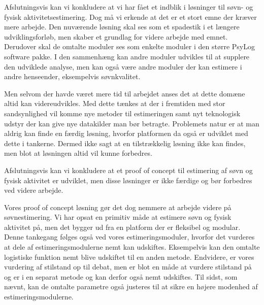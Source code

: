 Afslutningsvis kan vi konkludere at vi har fået et indblik i løsninger til søvn- og fysisk aktivitetsestimering.
Dog må vi erkende at det er et stort emne der kræver mere arbejde.
Den nuværende løsning skal ses som et spadestik i et længere udviklingsforløb, men skaber et grundlag for videre arbejde med emnet.
Derudover skal de omtalte moduler ses som enkelte moduler i den større PsyLog software pakke.
I den sammenhæng kan andre moduler udvikles til at supplere den udviklede analyse, men kan også være andre moduler der kan estimere i andre henseender, eksempelvis søvnkvalitet.


Men selvom der havde været mere tid til arbejdet anses det at dette domæne altid kan videreudvikles.
Med dette tænkes at der i fremtiden med stor sandsynlighed vil komme nye metoder til estimeringen samt nyt teknologisk udstyr der kan give nye datakilder man bør betragte.
Problemets natur er at man aldrig kan finde en færdig løsning, hvorfor platformen da også er udviklet med dette i tankerne.
Dermed ikke sagt at en tilstrækkelig løsning ikke kan findes, men blot at løsningen altid vil kunne forbedres.

Afslutningsvis kan vi konkludere at et proof of concept til estimering af søvn og fysisk aktivitet er udviklet, men disse løsninger er ikke færdige og bør forbedres ved videre arbejde.

Vores proof of concept løsning gør det dog nemmere at arbejde videre på søvnestimering.
Vi har opsat en primitiv måde at estimere søvn og fysisk aktivitet på, men det bygger ud fra en platform der er fleksibel og modular.
Denne tankegang følges også ved vores estimeringsmoduler, hvorfor det vurderes at dele af estimeringsmodulerne nemt kan udskiftes.
Eksempelvis kan den omtalte logistiske funktion nemt blive udskiftet til en anden metode.
Endvidere, er vores vurdering af stilstand op til debat, men er blot en måde at vurdere stilstand på og er i en separat metode og kan derfor også nemt udskiftes. 
Til sidst, som nævnt, kan de omtalte parametre også justeres til at sikre en højere modenhed af estimeringsmodulerne.



